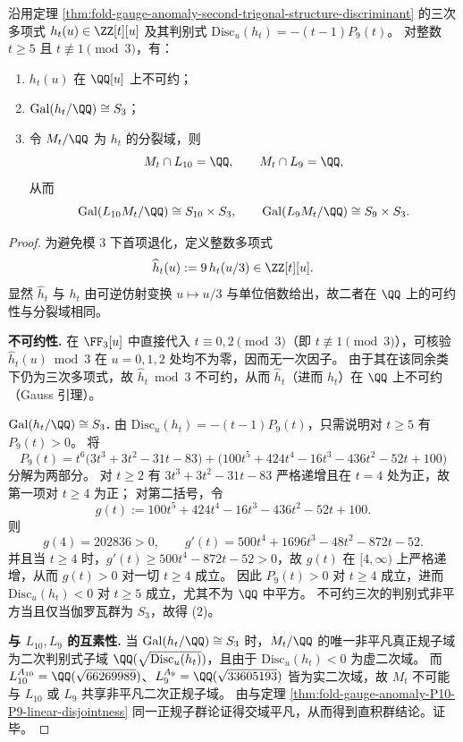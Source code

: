 \begin{theorem}\label{thm:fold-gauge-anomaly-second-trigonal-ht-specialization-s3-disjoint}
沿用定理 \ref{thm:fold-gauge-anomaly-second-trigonal-structure-discriminant} 的三次多项式 \(h_t(u)\in\ZZ[t][u]\) 及其判别式
\(
\mathrm{Disc}_u(h_t)=-(t-1)P_9(t)
\)。
对整数 \(t\ge 5\) 且 \(t\not\equiv 1\pmod 3\)，有：
\begin{enumerate}
  \item \(h_t(u)\) 在 \(\QQ[u]\) 上不可约；
  \item \(\mathrm{Gal}(h_t/\QQ)\cong S_3\)；
  \item 令 \(M_t/\QQ\) 为 \(h_t\) 的分裂域，则
  \[
  M_t\cap L_{10}=\QQ,\qquad M_t\cap L_9=\QQ,
  \]
  从而
  \[
  \mathrm{Gal}(L_{10}M_t/\QQ)\cong S_{10}\times S_3,\qquad
  \mathrm{Gal}(L_{9}M_t/\QQ)\cong S_{9}\times S_3.
  \]
\end{enumerate}
\end{theorem}
\begin{proof}
为避免模 \(3\) 下首项退化，定义整数多项式
\[
\widehat h_t(u):=9\,h_t(u/3)\in\ZZ[t][u].
\]
显然 \(\widehat h_t\) 与 \(h_t\) 由可逆仿射变换 \(u\mapsto u/3\) 与单位倍数给出，故二者在 \(\QQ\) 上的可约性与分裂域相同。
\par
\textbf{不可约性.}
在 \(\FF_3[u]\) 中直接代入 \(t\equiv 0,2\pmod 3\)（即 \(t\not\equiv 1\pmod 3\)），可核验 \(\widehat h_t(u)\bmod 3\) 在 \(u=0,1,2\) 处均不为零，因而无一次因子。
由于其在该同余类下仍为三次多项式，故 \(\widehat h_t\bmod 3\) 不可约，从而 \(\widehat h_t\)（进而 \(h_t\)）在 \(\QQ\) 上不可约（Gauss 引理）。
\par
\textbf{\(\mathrm{Gal}(h_t/\QQ)\cong S_3\).}
由 \(\mathrm{Disc}_u(h_t)=-(t-1)P_9(t)\)，只需说明对 \(t\ge 5\) 有 \(P_9(t)>0\)。
将
\[
P_9(t)=t^6\bigl(3t^3+3t^2-31t-83\bigr)+\bigl(100t^5+424t^4-16t^3-436t^2-52t+100\bigr)
\]
分解为两部分。
对 \(t\ge 2\) 有 \(3t^3+3t^2-31t-83\) 严格递增且在 \(t=4\) 处为正，故第一项对 \(t\ge 4\) 为正；
对第二括号，令
\[
g(t):=100t^5+424t^4-16t^3-436t^2-52t+100.
\]
则
\[
g(4)=202836>0,
\qquad
g'(t)=500t^4+1696t^3-48t^2-872t-52.
\]
并且当 \(t\ge 4\) 时，\(g'(t)\ge 500t^4-872t-52>0\)，故 \(g(t)\) 在 \([4,\infty)\) 上严格递增，从而 \(g(t)>0\) 对一切 \(t\ge 4\) 成立。
因此 \(P_9(t)>0\) 对 \(t\ge 4\) 成立，进而 \(\mathrm{Disc}_u(h_t)<0\) 对 \(t\ge 5\) 成立，尤其不为 \(\QQ\) 中平方。
不可约三次的判别式非平方当且仅当伽罗瓦群为 \(S_3\)，故得 (2)。
\par
\textbf{与 \(L_{10},L_9\) 的互素性.}
当 \(\mathrm{Gal}(h_t/\QQ)\cong S_3\) 时，\(M_t/\QQ\) 的唯一非平凡真正规子域为二次判别式子域
\(
\QQ(\sqrt{\mathrm{Disc}_u(h_t)})
\)，且由于 \(\mathrm{Disc}_u(h_t)<0\) 为虚二次域。
而 \(L_{10}^{A_{10}}=\QQ(\sqrt{66269989})\)、\(L_9^{A_9}=\QQ(\sqrt{33605193})\) 皆为实二次域，故 \(M_t\) 不可能与 \(L_{10}\) 或 \(L_9\) 共享非平凡二次正规子域。
由与定理 \ref{thm:fold-gauge-anomaly-P10-P9-linear-disjointness} 同一正规子群论证得交域平凡，从而得到直积群结论。证毕。
\end{proof}

